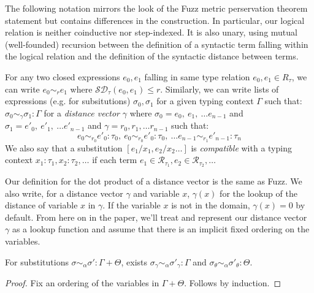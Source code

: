 The following notation mirrors the look of the Fuzz metric perservation theorem
statement but contains differences in the construction. In particular, our
logical relation is neither coinductive nor step-indexed. It is also unary,
using mutual (well-founded) recursion between the definition of a syntactic term
falling within the logical relation and the definition of the syntactic distance
between terms.

For any two closed expressions $e_0, e_1$ falling in same type relation $e_0,
e_1 \in R_\tau$, we can write $e_0 \sim_r e_1$ where $\mathcal{SD}_{\tau}(e_0,
e_1) \leq r$. Similarly, we can write lists of expressions (e.g. for
subsitutions) $\sigma_0, \sigma_1$ for a given typing context $\Gamma$ such
that: $\sigma_0 \sim_{\gamma} \sigma_1 : \Gamma$ for a \textit{distance vector}
$\gamma$
where
$\sigma_0 = e_0,~e_1,~\ldots e_{n-1}$ 
and $\sigma_1 = e'_0,~e'_1,~\ldots e'_{n-1}$ 
and $\gamma = r_0, r_1, \ldots r_{n-1}$ such that:
$$e_0 \sim_{r_0} e'_0 : \tau_0,~e_0 \sim_{r_0} e'_0 : \tau_0,~\ldots e_{n-1}
\sim_{r_1} e'_{n-1} : \tau_n$$
We also say that a substitution $[e_1/x_1, e_2/x_2 \ldots]$ is
\textit{compatible} with a typing context $x_1 : \tau_1, x_2 : \tau_2, \ldots$
if each term $e_1 \in \mathcal{R}_{\tau_1}, e_2 \in \mathcal{R}_{\tau_2},
\ldots$

Our definition for the dot product of a distance vector is the same as Fuzz. We
also write, for a distance vector $\gamma$ and variable $x$, $\gamma(x)$ for the
lookup of the distance of variable $x$ in $\gamma$. If the variable $x$ is not
in the domain, $\gamma(x) = 0$ by default. From here on in the paper, we'll
treat and represent our distance vector $\gamma$ as a lookup function and assume
that there is an implicit fixed ordering on the variables.

%
\begin{lemma}
  \label{thm:sub-decomp}
  For substitutions $\sigma \sim_{\alpha} \sigma' : \Gamma + \Theta$,
  exists
  $\sigma_{\gamma} \sim_{\alpha} \sigma'_{\gamma} : \Gamma$
  and
  $\sigma_{\theta} \sim_{\alpha} \sigma'_{\theta} : \Theta$.
\end{lemma}
\begin{proof}
  Fix an ordering of the variables in $\Gamma + \Theta$. Follows by induction.
\end{proof}

